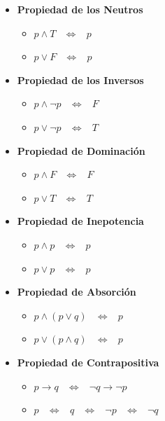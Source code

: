 \documentclass[12pt, fleqn]{report}                             %
\DeclareMathOperator \Space     {\quad}                         %
\DeclareMathOperator \MiniSpace {\;}                            %
\theoremstyle{break}                                            %
\newcommand \lEqual  {\MiniSpace \Leftrightarrow \MiniSpace}    %
\begin{document}
\begin{itemize}
                    \clearpage

                    \item \textbf{Propiedad de los Neutros}
                        \begin{itemize}
                            \item $p \land T \lEqual p$
                            \item $p \lor F \lEqual p$
                        \end{itemize}

                    \item \textbf{Propiedad de los Inversos}
                        \begin{itemize}
                            \item $p \land \lnot p \lEqual F$
                            \item $p \lor \lnot p \lEqual T$
                        \end{itemize}

                    \item \textbf{Propiedad de Dominación}
                        \begin{itemize}
                            \item $p \land F \lEqual F$
                            \item $p \lor T \lEqual T$
                        \end{itemize}

                    \item \textbf{Propiedad de Inepotencia}
                        \begin{itemize}
                            \item $p \land p \lEqual p$
                            \item $p \lor p \lEqual p$
                        \end{itemize}

                    \item \textbf{Propiedad de Absorción}
                        \begin{itemize}
                            \item $p \land (p \lor q) \lEqual p$
                            \item $p \lor (p \land q) \lEqual p$
                        \end{itemize}

                    \item \textbf{Propiedad de Contrapositiva}
                        \begin{itemize}
                            \item $p \to q \lEqual \lnot q \to \lnot p$
                            \item $p \lEqual q  \lEqual \lnot p \lEqual \lnot q$
                        \end{itemize}

                \end{itemize}
\end{document}
